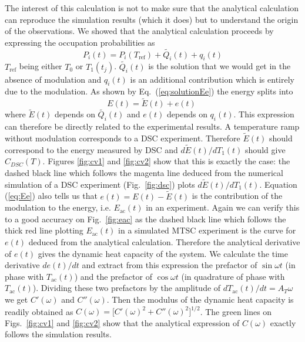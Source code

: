 \documentclass[pre,a4paper,twocolumn,superscriptaddress,%
floatfix]{revtex4}
\begin{document}
\medskip
The interest of this calculation is not to make sure that the analytical
calculation can reproduce the simulation results (which it does) but to
understand the origin of the observations. We showed that the analytical
calculation proceeds by expressing the occupation probabilities as
\begin{equation}
  \label{eq:PQq}
  P_i(t) = P_i(T_{\mathrm{ref}}) + \widetilde{Q_i}(t) + q_i(t) 
\end{equation}
$T_{\mathrm{ref}}$ being either $T_0$ or $T_1(t_j)$. 
$\widetilde{Q_i}(t)$ is the solution that we would get in the absence of
modulation and $q_i(t)$ is an additional contribution which is entirely due
to the modulation. As shown by Eq.~(\ref{eq:solutionEe}) the energy splits
into
\begin{equation}
  \label{eq:Ee}
  E(t) = \widetilde{E}(t) + e(t) \;
\end{equation}
where $\widetilde{E}(t)$ depends on $\widetilde{Q_i}(t)$ and $e(t)$ depends on
$q_i(t)$. This expression can therefore be directly related to the
experimental results. A temperature ramp without modulation corresponds to a
DSC experiment. Therefore $\widetilde{E}(t)$ should correspond to the energy
measured by DSC and $d \widetilde{E}(t) / dT_1(t)$ should give $C_{DSC}(T)$.
Figures \ref{fig:cv1} and \ref{fig:cv2} show that this is exactly the case:
the dashed black line which follows the magenta line deduced from the
numerical simulation of a DSC experiment (Fig.~\ref{fig:dsc}) plots
$d \widetilde{E}(t) / dT_1(t)$. Equation (\ref{eq:Ee}) also tells us that
$e(t) = E(t) - \widetilde{E}(t)$ is the contribution of the modulation to the
energy, i.e. $E_{\mathrm{ac}}(t)$ in an experiment. Again we can verify this
to a good accuracy on Fig.~\ref{fig:eac} as the dashed black line which
follows the thick red line plotting $E_{\mathrm{ac}}(t)$ in a simulated MTSC
experiment is the curve for $e(t)$ deduced from the analytical calculation.
Therefore the analytical derivative of $e(t)$ gives the dynamic heat
capacity of the system. We calculate the time derivative $de(t)/dt$ and
extract from this expression the prefactor of $\sin \omega t$ (in phase with
$T_{\mathrm{ac}}(t)$) and the prefactor of $\cos \omega t$ (in quadrature
of phase with $T_{\mathrm{ac}}(t)$). Dividing these two prefactors by the
amplitude of $d T_{\mathrm{ac}}(t)/dt = A_T \omega$ we get $C'(\omega)$ and
$C''(\omega)$. Then
the modulus of the dynamic heat capacity is readily obtained as
$C(\omega) = \big[ C'(\omega)^2 + C''(\omega)^2 \big]^{1/2}$. The green lines on
Figs.~\ref{fig:cv1} and
\ref{fig:cv2} show that the analytical expression of $C(\omega)$ exactly
follows the simulation results.
\end{document}
